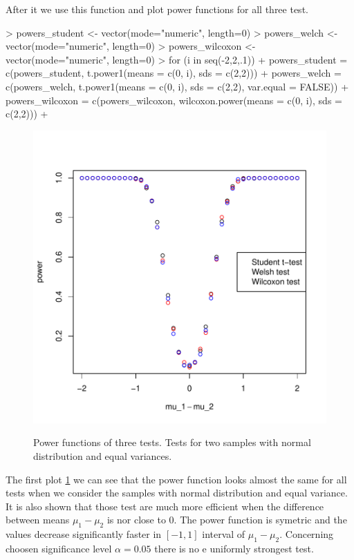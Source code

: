 \documentclass{article}
\begin{document}
After it we use this function and plot power functions for all three test.
\begin{Schunk}
\begin{Sinput}
>   powers_student <- vector(mode="numeric", length=0)
>   powers_welch <- vector(mode="numeric", length=0)
>   powers_wilcoxon <- vector(mode="numeric", length=0)
>   for (i in seq(-2,2,.1)){
+     powers_student = c(powers_student, t.power1(means = c(0, i), sds = c(2,2)))
+     powers_welch = c(powers_welch, t.power1(means = c(0, i), sds = c(2,2), var.equal = FALSE))
+     powers_wilcoxon = c(powers_wilcoxon, wilcoxon.power(means = c(0, i), sds = c(2,2)))
+   }
\end{Sinput}
\end{Schunk}
\begin{figure}
\center
\includegraphics{p1-task_1_plot}
\label{chart_t1}
\caption{Power functions of three tests. Tests for two samples with normal distribution and equal variances.}
\end{figure}
The first plot \ref{chart_t1} we can see that the power function looks almost the same for all tests when we consider the samples with normal distribution and equal variance. It is also shown that those test are much more efficient when the difference between means $\mu_1-\mu_2$ is nor close to 0. The power function is symetric and the values decrease significantly faster in $[-1, 1]$ interval of $\mu_1-\mu_2$. Concerning choosen significance level $\alpha=0.05$ there is no e uniformly strongest test.
\end{document}
